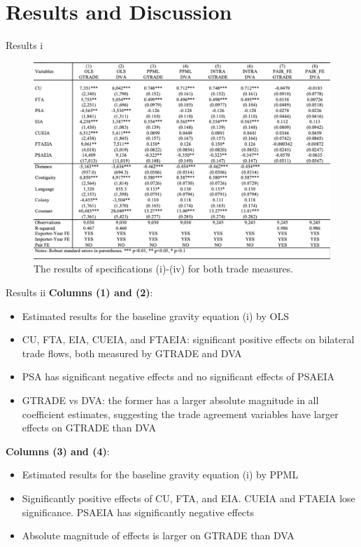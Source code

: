 \documentclass[10pt]{beamer}
\begin{document}

\section{Results and Discussion}

\begin{frame}{Results i}
    \begin{figure}
    \includegraphics[scale=0.4]{results.PNG} 
    \tiny{\caption{The results of specifications (i)-(iv) for both trade measures.}}
    \end{figure}
\end{frame}
    
\begin{frame}{Results ii}
\textbf{Columns (1) and (2)}:
\begin{itemize}
    \item Estimated results for the baseline gravity equation (i) by OLS
    \item CU, FTA, EIA, CUEIA, and FTAEIA: significant  positive  effects on bilateral trade flows, both measured by GTRADE and DVA
    \item PSA has significant negative effects and no significant effects of PSAEIA
    \item GTRADE vs DVA: the former has a larger absolute magnitude in all coeﬀicient estimates, suggesting the trade agreement variables have larger effects on GTRADE than DVA
\end{itemize}

\textbf{Columns (3) and (4)}:
\begin{itemize}
    \item Estimated results for the baseline gravity equation (i) by PPML
    \item Significantly positive effects of CU, FTA, and EIA. CUEIA and FTAEIA lose significance. PSAEIA has significantly negative effects
    \item Absolute magnitude of effects is larger on GTRADE than DVA
\end{itemize}
\end{frame}
\end{document}

